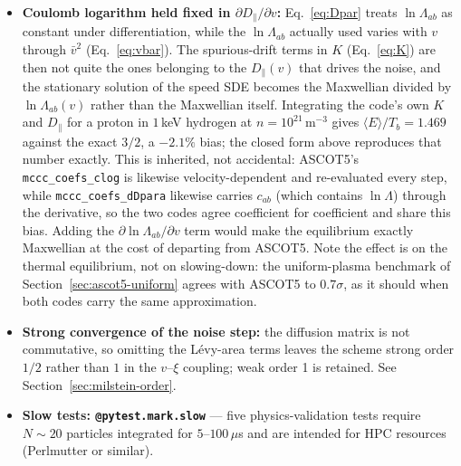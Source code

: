 \documentclass[11pt]{article}
\newcommand{\lnL}{\ln\Lambda}
\begin{document}
\begin{itemize}
  \item \textbf{Coulomb logarithm held fixed in $\partial D_\parallel/\partial v$:}
        Eq.~\eqref{eq:Dpar} treats $\lnL_{ab}$ as constant under
        differentiation, while the $\lnL_{ab}$ actually used varies with $v$
        through $\bar v^2$ (Eq.~\eqref{eq:vbar}).  The spurious-drift terms in
        $K$ (Eq.~\eqref{eq:K}) are then not quite the ones belonging to the
        $D_\parallel(v)$ that drives the noise, and the stationary solution of
        the speed SDE becomes the Maxwellian divided by $\lnL_{ab}(v)$ rather
        than the Maxwellian itself.  Integrating the code's own $K$ and
        $D_\parallel$ for a proton in $1$\,keV hydrogen at
        $n=10^{21}\,\mathrm{m}^{-3}$ gives $\langle E\rangle/T_b = 1.469$
        against the exact $3/2$, a $-2.1\%$ bias; the closed form above
        reproduces that number exactly.  This is inherited, not accidental:
        ASCOT5's \texttt{mccc\_coefs\_clog} is likewise velocity-dependent and
        re-evaluated every step, while \texttt{mccc\_coefs\_dDpara} likewise
        carries $c_{ab}$ (which contains $\ln\Lambda$) through the derivative,
        so the two codes agree coefficient for coefficient and share this
        bias.  Adding the $\partial\lnL_{ab}/\partial v$ term would make the
        equilibrium exactly Maxwellian at the cost of departing from ASCOT5.
        Note the effect is on the thermal equilibrium, not on slowing-down:
        the uniform-plasma benchmark of Section~\ref{sec:ascot5-uniform}
        agrees with ASCOT5 to $0.7\sigma$, as it should when both codes carry
        the same approximation.

  \item \textbf{Strong convergence of the noise step:} the diffusion matrix is
        not commutative, so omitting the L\'evy-area terms leaves the scheme
        strong order $1/2$ rather than $1$ in the $v$--$\xi$ coupling; weak
        order 1 is retained.  See Section~\ref{sec:milstein-order}.

  \item \textbf{Slow tests: \texttt{@pytest.mark.slow}} --- five physics-validation
        tests require $N\sim 20$ particles integrated for $5$--$100\,\mu$s and are
        intended for HPC resources (Perlmutter or similar).
\end{itemize}
\end{document}
